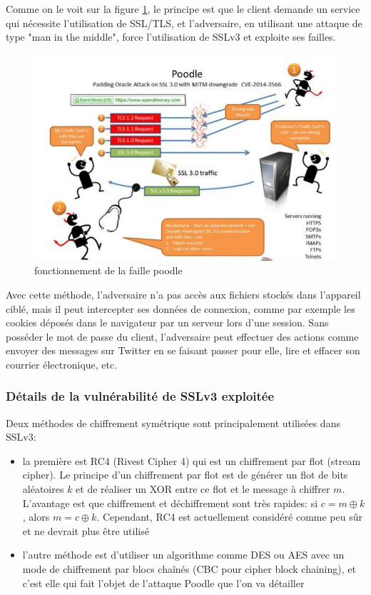 Comme on le voit sur la figure \ref{poodle}, le principe est que le client demande un service qui nécessite l'utilisation de SSL/TLS, et l'adversaire, en utilisant une attaque de type "man in the middle", force l'utilisation de SSLv3 et exploite ses failles.

\begin{figure}[H]
\includegraphics[scale=0.7]{img/poodle.jpg}
\caption{fonctionnement de la faille poodle}
\label{poodle}
\end{figure}

Avec cette méthode, l'adversaire n’a pas accès aux fichiers stockés dans l’appareil ciblé, mais il peut intercepter ses données de connexion, comme par exemple les cookies déposés dans le navigateur par un serveur lors d’une session. Sans posséder le mot de passe du client, l'adversaire peut effectuer des actions comme envoyer des messages sur Twitter en se faisant passer pour elle, lire et effacer son courrier électronique, etc.

\subsubsection{Détails de la vulnérabilité de SSLv3 exploitée}

Deux méthodes de chiffrement symétrique sont principalement utilisées dans SSLv3:
\begin{itemize}
\item la première est RC4 (Rivest Cipher 4) qui est un chiffrement par flot (stream cipher). Le principe d'un chiffrement par flot est de générer un flot de bits aléatoires $k$ et de réaliser un XOR entre ce flot et le message à chiffrer $m$. L'avantage est que chiffrement et déchiffrement sont très rapides: si $c = m \oplus k$, alors $m = c \oplus k$. Cependant, RC4 est actuellement considéré comme peu s\^ur et ne devrait plus \^etre utilisé
\item l'autre méthode est d'utiliser un algorithme comme DES ou AES avec un mode de chiffrement par blocs cha\^inés (CBC pour cipher block chaining), et c'est elle qui fait l'objet de l'attaque Poodle que l'on va détailler
\end{itemize}

